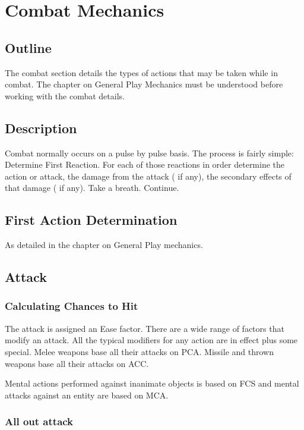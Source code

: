 \chapter{Combat Mechanics}

\section{Outline}

The combat section details the types of actions that may be taken 
while in combat. The chapter on General Play Mechanics must be 
understood before working with the combat details.

\section{Description}

Combat normally occurs on a pulse by pulse basis. The process is 
fairly simple: Determine First Reaction. For each of those reactions in 
order determine the action or attack, the damage from the attack ( if 
any), the secondary effects of that damage ( if any). Take a breath. 
Continue. 

\section{First Action Determination}

As detailed in the chapter on General Play mechanics.

\section{Attack}

\subsection{Calculating Chances to Hit}

The attack is assigned an Ease factor. There are a wide range of factors
that modify an attack. All the typical modifiers for any action are 
in effect plus some special. Melee weapons base all their attacks on PCA.
Missile and thrown weapons base all their attacks on ACC.

Mental actions performed against inanimate objects is based on FCS
and mental attacks against an entity are based on MCA.

\subsection{All out attack}

